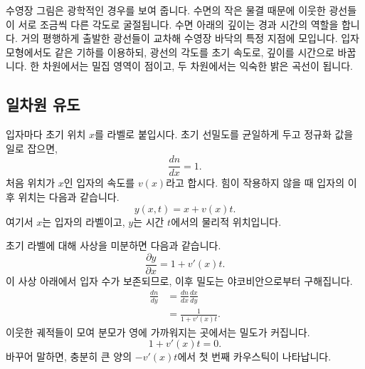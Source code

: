 수영장 그림은 광학적인 경우를 보여 줍니다. 수면의 작은 물결 때문에 이웃한 광선들이 서로 조금씩 다른 각도로 굴절됩니다. 수면 아래의 깊이는 경과 시간의 역할을 합니다. 거의 평행하게 출발한 광선들이 교차해 수영장 바닥의 특정 지점에 모입니다. 입자 모형에서도 같은 기하를 이용하되, 광선의 각도를 초기 속도로, 깊이를 시간으로 바꿉니다. 한 차원에서는 밀집 영역이 점이고, 두 차원에서는 익숙한 밝은 곡선이 됩니다.

\subsection{일차원 유도}

입자마다 초기 위치 \(x\)를 라벨로 붙입시다. 초기 선밀도를 균일하게 두고 정규화 값을 일로 잡으면,
\begin{equation}
\frac{dn}{dx}=1.
\label{eq:c09-initial-density}
\end{equation}
처음 위치가 \(x\)인 입자의 속도를 \(v(x)\)라고 합시다. 힘이 작용하지 않을 때 입자의 이후 위치는 다음과 같습니다.
\begin{equation}
y(x,t)=x+v(x)t.
\label{eq:c09-ballistic-map}
\end{equation}
여기서 \(x\)는 입자의 라벨이고, \(y\)는 시간 \(t\)에서의 물리적 위치입니다.

초기 라벨에 대해 사상을 미분하면 다음과 같습니다.
\begin{equation}
\frac{\partial y}{\partial x}
=1+v'(x)t.
\label{eq:c09-jacobian}
\end{equation}
이 사상 아래에서 입자 수가 보존되므로, 이후 밀도는 야코비안으로부터 구해집니다.
\begin{align}
\frac{dn}{dy}
&=
\frac{dn}{dx}\frac{dx}{dy}\\
&=
\frac{1}{1+v'(x)t}.
\label{eq:c09-caustic-density}
\end{align}
이웃한 궤적들이 모여 분모가 영에 가까워지는 곳에서는 밀도가 커집니다.
\begin{equation}
1+v'(x)t=0.
\label{eq:c09-caustic-condition}
\end{equation}
바꾸어 말하면, 충분히 큰 양의 \(-v'(x)t\)에서 첫 번째 카우스틱이 나타납니다.

